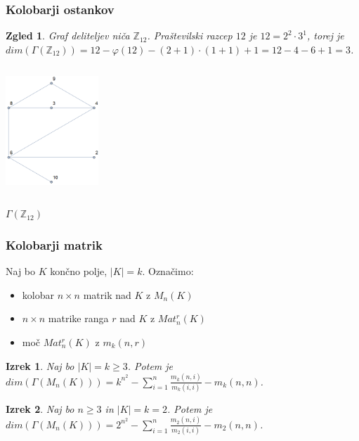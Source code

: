 \documentclass{beamer}
\def\Z{\mathbb{Z}} %
\newtheorem{izrek}{Izrek}
\newtheorem{zgled}{Zgled}
\begin{document}

\begin{frame}
    \frametitle{Kolobarji ostankov}
    \begin{zgled}
        Graf deliteljev niča $\Z_{12}$. Praštevilski razcep $12$ je $12 = 2^2 \cdot 3^1$, torej je \\
        $dim(\Gamma(\Z_{12})) = 12 - \varphi(12) - (2 + 1)\cdot(1 + 1) + 1 = 12 - 4 - 6 + 1 = 3$.
    \end{zgled}
    \begin{center}
        \includegraphics[width=3.5cm, height=4.8cm]{z12.png}
    \end{center}
    \begin{center}
        $\Gamma(\Z_{12})$
    \end{center}
    
\end{frame}    



\begin{frame}
    \frametitle{Kolobarji matrik}
    Naj bo $K$ končno polje, $|K| = k$. Označimo:
    \begin{itemize}
        \item kolobar $n \times n$ matrik nad $K$ z $M_n(K)$
        \item $n \times n$ matrike ranga $r$ nad $K$ z $Mat_n^r(K)$
        \item moč $Mat_n^r(K)$ z $m_k(n,r)$
    \end{itemize}

    \begin{izrek}
        Naj bo $|K| = k \geq 3$. Potem je \\
        $dim(\Gamma(M_n(K))) = k^{n^2} - \sum_{i=1}^{n}\frac{m_k(n,i)}{m_k(i,i)} - m_k(n,n)$.
    \end{izrek}

    \begin{izrek}
        Naj bo $n \geq 3$ in $|K| = k = 2$. Potem je \\
        $dim(\Gamma(M_n(K))) = 2^{n^2} - \sum_{i=1}^{n}\frac{m_2(n,i)}{m_2(i,i)} - m_2(n,n)$.
    \end{izrek}
    
\end{frame}  
    
\end{document}
